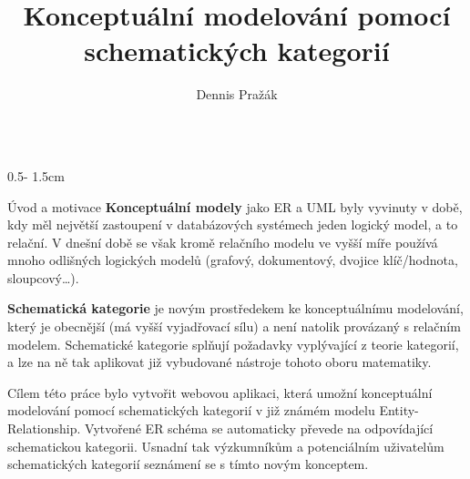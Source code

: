 \documentclass[a0paper]{uioposter}
\title{Konceptuální modelování pomocí schematických kategorií}
\author{Dennis Pražák}
\institute{\href{mailto:prazak.dennis@gmail.com}{\texttt{prazak.dennis@gmail.com}}}
\begin{document}
\begin{frame}
  \begin{columns}[onlytextwidth]
    \begin{column}{0.5\textwidth - 1.5cm}
      \begin{block}{Úvod a motivace}
        \textbf{\alert{Konceptuální modely}} jako ER a UML byly vyvinuty v době, kdy měl největší zastoupení v databázových systémech jeden logický model, a to relační.
        V dnešní době se však kromě relačního modelu ve vyšší míře používá mnoho odlišných logických modelů (grafový, dokumentový, dvojice klíč/hodnota, sloupcový\dots).

        \textbf{\alert{Schematická kategorie}} je novým prostředekem ke konceptuálnímu modelování, který je obecnější (má vyšší vyjadřovací sílu) a není natolik provázaný s relačním modelem.
        Schematické kategorie splňují požadavky vyplývající z teorie kategorií, a lze na ně tak aplikovat již vybudované nástroje tohoto oboru matematiky.

        Cílem této práce bylo vytvořit webovou aplikaci, která umožní konceptuální modelování pomocí schematických kategorií v již známém modelu Entity-Relationship.
        Vytvořené ER schéma se automaticky převede na odpovídající schematickou kategorii.
        Usnadní tak výzkumníkům a potenciálním uživatelům schematických kategorií seznámení se s tímto novým konceptem.
      \end{block}


\end{column}
\end{columns}
\end{frame}
\end{document}
